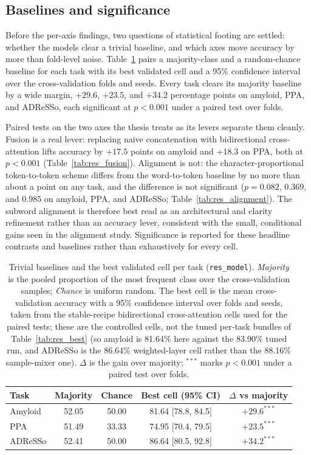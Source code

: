 \subsection{Baselines and significance}
\label{ssec:res_baselines}

Before the per-axis findings, two questions of statistical footing are settled: whether the models clear a trivial baseline, and which axes move accuracy by more than fold-level noise. Table~\ref{tab:res_baselines} pairs a majority-class and a random-chance baseline for each task with its best validated cell and a 95\% confidence interval over the cross-validation folds and seeds. Every task clears its majority baseline by a wide margin, $+29.6$, $+23.5$, and $+34.2$ percentage points on amyloid, PPA, and ADReSSo, each significant at $p<0.001$ under a paired test over folds.

Paired tests on the two axes the thesis treats as its levers separate them cleanly. Fusion is a real lever: replacing naive concatenation with bidirectional cross-attention lifts accuracy by $+17.5$ points on amyloid and $+18.3$ on PPA, both at $p<0.001$ (Table~\ref{tab:res_fusion}). Alignment is not: the character-proportional token-to-token scheme differs from the word-to-token baseline by no more than about a point on any task, and the difference is not significant ($p=0.082$, $0.369$, and $0.985$ on amyloid, PPA, and ADReSSo; Table~\ref{tab:res_alignment}). The subword alignment is therefore best read as an architectural and clarity refinement rather than an accuracy lever, consistent with the small, conditional gains seen in the alignment study. Significance is reported for these headline contrasts and baselines rather than exhaustively for every cell.

\begin{table}[htbp]
\centering
\caption[Baselines and significance]{Trivial baselines and the best validated cell per task (\texttt{res\_model}). \emph{Majority} is the pooled proportion of the most frequent class over the cross-validation samples; \emph{Chance} is uniform random. The best cell is the mean cross-validation accuracy with a 95\% confidence interval over folds and seeds, taken from the stable-recipe bidirectional cross-attention cells used for the paired tests; these are the controlled cells, not the tuned per-task bundles of Table~\ref{tab:res_best} (so amyloid is 81.64\% here against the 83.90\% tuned run, and ADReSSo is the 86.64\% weighted-layer cell rather than the 88.16\% sample-mixer one). $\Delta$ is the gain over majority; $^{\ast\ast\ast}$ marks $p<0.001$ under a paired test over folds.}
\label{tab:res_baselines}
\small
\begin{tabular}{lcccc}
\toprule
Task & Majority & Chance & Best cell (95\% CI) & $\Delta$ vs majority \\
\midrule
Amyloid & 52.05 & 50.00 & 81.64 [78.8, 84.5] & $+29.6^{\ast\ast\ast}$ \\
PPA     & 51.49 & 33.33 & 74.95 [70.4, 79.5] & $+23.5^{\ast\ast\ast}$ \\
ADReSSo & 52.41 & 50.00 & 86.64 [80.5, 92.8] & $+34.2^{\ast\ast\ast}$ \\
\bottomrule
\end{tabular}
\end{table}

